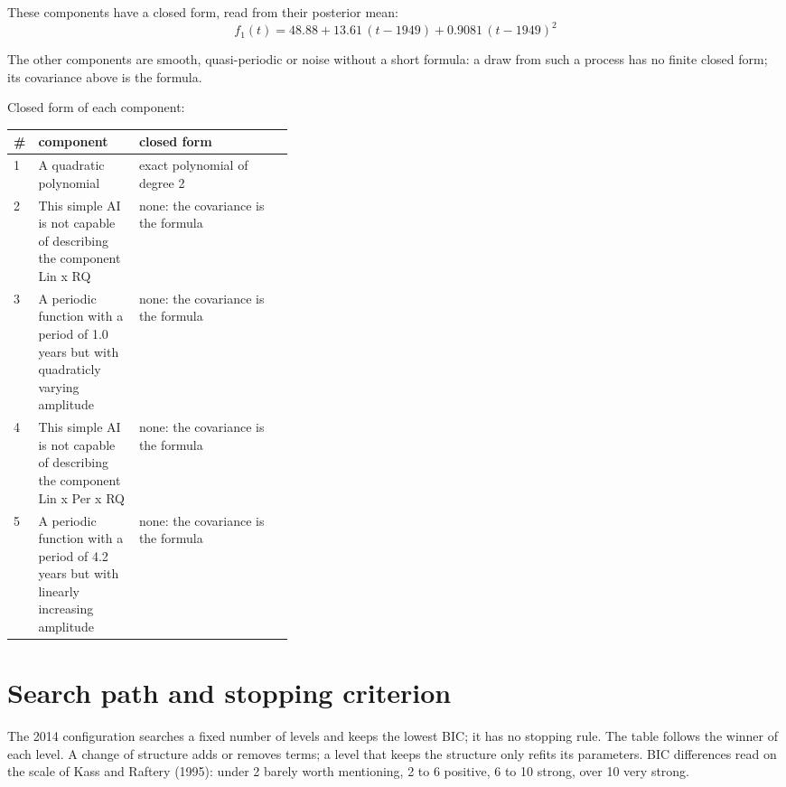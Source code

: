 \documentclass[11pt,a4paper]{article}
\begin{document}
These components have a closed form, read from their posterior mean:
\begin{dmath*}
f_{1}(t) = 48.88 + 13.61\,(t - 1949) + 0.9081\,(t - 1949)^{2}
\end{dmath*}

The other components are smooth, quasi-periodic or noise without a short formula: a draw from such a process has no finite closed form; its covariance above is the formula.

Closed form of each component:

\begin{center}\footnotesize
\begin{tabular}{lp{0.36\linewidth}l}
\toprule
\# & component & closed form \\
\midrule
1 & A quadratic polynomial & exact polynomial of degree 2 \\
2 & This simple AI is not capable of describing the component Lin x RQ & none: the covariance is the formula \\
3 & A periodic function with a period of 1.0 years but with quadraticly varying amplitude & none: the covariance is the formula \\
4 & This simple AI is not capable of describing the component Lin x Per x RQ & none: the covariance is the formula \\
5 & A periodic function with a period of 4.2 years but with linearly increasing amplitude & none: the covariance is the formula \\
\bottomrule
\end{tabular}
\end{center}

\section*{Search path and stopping criterion}

The 2014 configuration searches a fixed number of levels and keeps the lowest BIC; it has no stopping rule. The table follows the winner of each level. A change of structure adds or removes terms; a level that keeps the structure only refits its parameters. BIC differences read on the scale of Kass and Raftery (1995): under 2 barely worth mentioning, 2 to 6 positive, 6 to 10 strong, over 10 very strong.
\end{document}
